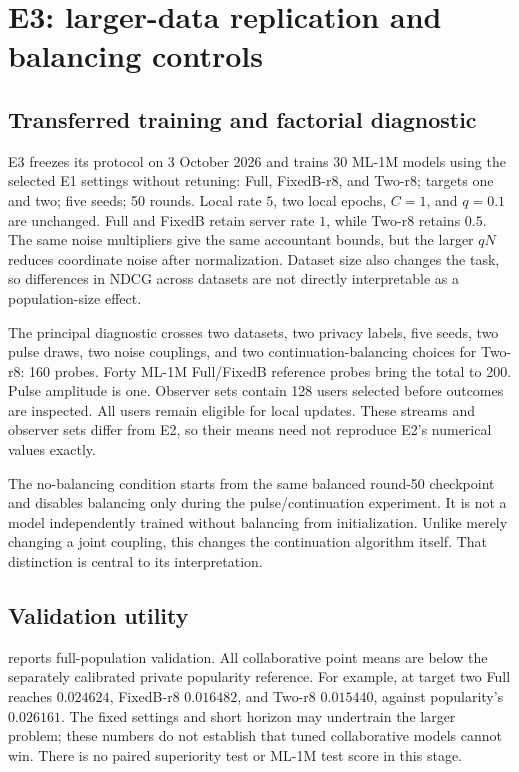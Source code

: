 \section{E3: larger-data replication and balancing controls}
\label{sec:e3}
\subsection{Transferred training and factorial diagnostic}
E3 freezes its protocol on 3 October 2026 and trains 30 ML-1M models using
the selected E1 settings without retuning: Full, FixedB-r8, and Two-r8;
targets one and two; five seeds; 50 rounds. Local rate $5$, two local epochs,
$C=1$, and $q=0.1$ are unchanged. Full and FixedB retain server rate $1$,
while Two-r8 retains $0.5$. The same noise multipliers give the same
accountant bounds, but the larger $qN$ reduces coordinate noise after
normalization. Dataset size also changes the task, so differences in NDCG
across datasets are not directly interpretable as a population-size effect.

The principal diagnostic crosses two datasets, two privacy labels, five
seeds, two pulse draws, two noise couplings, and two continuation-balancing
choices for Two-r8: 160 probes. Forty ML-1M Full/FixedB reference probes
bring the total to 200. Pulse amplitude is one. Observer sets contain 128
users selected before outcomes are inspected. All users remain eligible
for local updates. These streams and observer sets differ from E2, so
their means need not reproduce E2's numerical values exactly.

The no-balancing condition starts from the same balanced round-50 checkpoint
and disables balancing only during the pulse/continuation experiment. It
is not a model independently trained without balancing from initialization.
Unlike merely changing a joint coupling, this changes the continuation
algorithm itself. That distinction is central to its interpretation.

\subsection{Validation utility}

 reports full-population validation. All collaborative
point means are below the separately calibrated private popularity reference.
For example, at target two Full reaches $0.024624$, FixedB-r8 $0.016482$,
and Two-r8 $0.015440$, against popularity's $0.026161$. The fixed settings
and short horizon may undertrain the larger problem; these numbers do not
establish that tuned collaborative models cannot win. There is no paired
superiority test or ML-1M test score in this stage.

